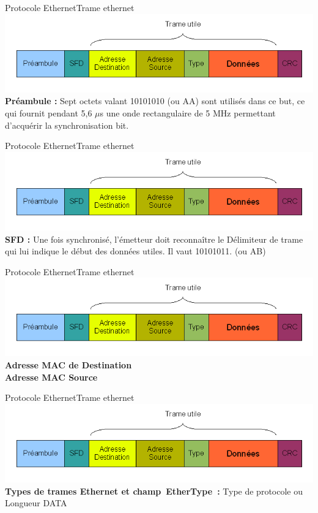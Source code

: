 \documentclass{beamer}
\begin{document}
	\begin{frame}{Protocole Ethernet}{Trame ethernet}
		\includegraphics[scale=0.7]{trame.png}
		\textbf{Préambule :} Sept octets valant 10101010 (ou AA) sont utilisés dans ce but, ce qui fournit pendant 5,6 $\mu$s une onde rectangulaire de 5 MHz permettant d'acquérir la synchronisation bit.
	\end{frame}

	\begin{frame}{Protocole Ethernet}{Trame ethernet}
		\includegraphics[scale=0.7]{trame.png}
		\textbf{SFD :} Une fois synchronisé, l'émetteur doit reconnaître le Délimiteur de trame qui lui indique le début des données utiles. Il vaut 10101011. (ou AB)
	\end{frame}

	\begin{frame}{Protocole Ethernet}{Trame ethernet}
		\includegraphics[scale=0.7]{trame.png}
		\textbf{Adresse MAC de Destination} \\
		\textbf{Adresse MAC Source}
	\end{frame}

	\begin{frame}{Protocole Ethernet}{Trame ethernet}
		\includegraphics[scale=0.7]{trame.png}
		\textbf{Types de trames Ethernet et champ EtherType :} Type de protocole ou Longueur DATA 
	\end{frame}
\end{document}

